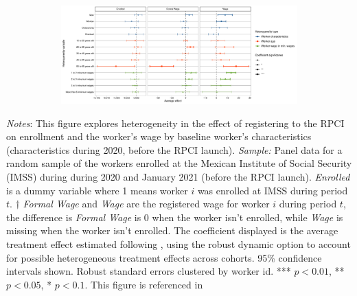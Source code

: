 \documentclass[oneside,11pt]{article}
\begin{document}

\begin{figure}[H]
    \centering
    \caption{Heterogeneity by worker characteristics \label{fig:heterogeneity_worker_rpci}}
    
    \begin{subfigure}{\textwidth}
    \includegraphics[width=\textwidth]{04_Figures/muestra_10porciento/dcdh_heterogeneity_worker_characteristics_paper.pdf}
    \end{subfigure}
    
\end{figure}

\scriptsize{
\noindent \textit{Notes}: This figure explores heterogeneity in the effect of registering to the RPCI on enrollment and the worker's wage by baseline worker's characteristics (characteristics during 2020, before the RPCI launch). \textit{Sample:} Panel data for a random sample of the workers enrolled at the Mexican Institute of Social Security (IMSS) during during 2020 and January 2021 (before the RPCI launch). \textit{Enrolled} is a dummy variable where 1 means worker $i$ was enrolled at IMSS during period $t$. $\dagger$ \textit{Formal Wage} and \textit{Wage} are the registered wage for worker $i$ during period $t$, the difference is \textit{Formal Wage} is 0 when the worker isn't enrolled, while \textit{Wage} is missing when the worker isn't enrolled. The coefficient displayed is the average treatment effect estimated following \cite{de2020two}, using the robust dynamic option to account for possible heterogeneous treatment effects across cohorts. 95\% confidence intervals shown. Robust standard errors clustered by worker id. *** $p<0.01$, ** $p<0.05$, * $p<0.1$. This figure is referenced in %
}
\end{document}
